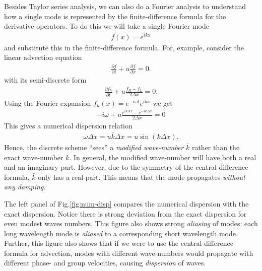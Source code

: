 \documentclass[12pt]{article}
\theoremstyle{definition}
\theoremstyle{definition}
\theoremstyle{definition}
\newcommand{\pfrac}[2]{\frac{\partial #1}{\partial #2}}
\begin{document}
Besides Taylor series analysis, we can also do a Fourier analysis to
understand how a single mode is represented by the finite-difference
formula for the derivative operators. To do this we will take a single
Fourier mode
\begin{align}
  f(x) = e^{ikx}
\end{align}
and substitute this in the finite-difference formula. For, example,
consider the linear advection equation
\begin{align}
  \pfrac{f}{t} + u \pfrac{f}{x} = 0.
\end{align}
with its semi-discrete form
\begin{align}
  \pfrac{f_h}{t} + u \frac{f_R - f_L}{2 \Delta x} = 0.
\end{align}
Using the Fourier expansion $f_h(x) = e^{-i\omega t} e^{ikx}$ we get
\begin{align}
  -i\omega + u \frac{e^{ik \Delta x } - e^{-ik \Delta x } }{2 \Delta x} = 0
\end{align}
This gives a numerical dispersion relation
\begin{align}
  \omega \Delta x  =  u \bar{k} \Delta x = u \sin(k\Delta x).
  \label{eq:adv-1d-cd-disp}
\end{align}
Hence, the discrete scheme ``sees'' a \emph{modified wave-number}
$\bar{k}$ rather than the exact wave-number $k$. In general, the
modified wave-number will have both a real and an imaginary
part. However, due to the symmetry of the central-difference formula,
$\bar{k}$ only has a real-part. This means that the mode propagates
\emph{without any damping}. 

The left panel of Fig.\thinspace\ref{fig:num-disp} compares the
numerical dispersion with the exact dispersion.  Notice there is
strong deviation from the exact dispersion for even modest waves
numbers. This figure also shows strong \emph{aliasing} of modes: each
long wavelength mode is \emph{aliased} to a corresponding short
wavelength mode. Further, this figure also shows that if we were to
use the central-difference formula for advection, modes with different
wave-numbers would propagate with different phase- and group
velocities, causing \emph{dispersion} of waves.
\end{document}
